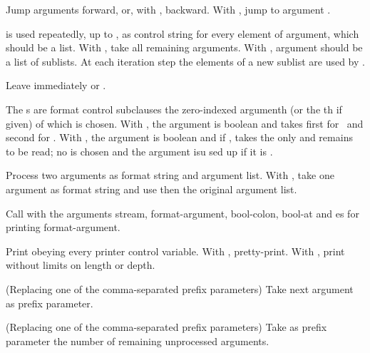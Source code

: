 \begin{LIST}{1cm}
\begin{LIST}{.5cm}
    {\index{\TLD *}
    Jump  arguments forward, or, with \kwd{:}, backward. With
    , jump to argument .
  }

    {
     is used repeatedly, up to , as control
    string for every element of argument, which should be a list. With
    , take all remaining arguments. With \kwd{:}, argument should be
    a list of sublists. At each iteration step the elements of a new
    sublist are used by . 
  }

    \IT{\KWD{\TLD\^{}}}
    {\index{\TLD\^{}}
    Leave immediately \kwd{\TLD\boldmath{$<$} \TLD\boldmath{$>$}} or
    \kwd{\TLD\boldmath{$\{$} \TLD\boldmath{$\}$}}.
  }

    {\index{\TLD [ ]}
    The s are format control subclauses the zero-indexed argumenth (or the
    th if given) of which is chosen. With \kwd{:}, the argument
    is boolean and takes first  for \NIL\ and second
     for \T. With , the argument is boolean and if \T, takes
    the only  and remains to be read; no  is
    chosen and the argument isu sed up if it is \NIL.
  }

    {
    Process two arguments as format string and argument list. With
    , take one argument as format string and use then the
    original argument list.
  }

    {\index{\TLD//}
    Call  with the arguments stream, format-ar\-gu\-ment,
    bool-colon, bool-at and es for printing format-argument.
  }

    {
    Print obeying every printer control variable. With \kwd{:},
    pretty-print. With , print without limits on length or depth.
  }

    {
    (Replacing one of the comma-separated prefix parameters) Take next
    argument as prefix parameter.
  }

    \IT{\KWD{\#}}
    {\index{\# }
    (Replacing one of the comma-separated prefix parameters) Take as
    prefix parameter the number of remaining unprocessed arguments.
  }

  \end{LIST}

\end{LIST}


